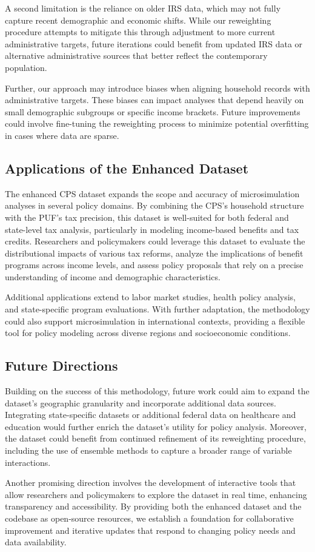 A second limitation is the reliance on older IRS data, which may not fully capture recent demographic and economic shifts. While our reweighting procedure attempts to mitigate this through adjustment to more current administrative targets, future iterations could benefit from updated IRS data or alternative administrative sources that better reflect the contemporary population.

Further, our approach may introduce biases when aligning household records with administrative targets. These biases can impact analyses that depend heavily on small demographic subgroups or specific income brackets. Future improvements could involve fine-tuning the reweighting process to minimize potential overfitting in cases where data are sparse.

\subsection{Applications of the Enhanced Dataset}

The enhanced CPS dataset expands the scope and accuracy of microsimulation analyses in several policy domains. By combining the CPS's household structure with the PUF's tax precision, this dataset is well-suited for both federal and state-level tax analysis, particularly in modeling income-based benefits and tax credits. Researchers and policymakers could leverage this dataset to evaluate the distributional impacts of various tax reforms, analyze the implications of benefit programs across income levels, and assess policy proposals that rely on a precise understanding of income and demographic characteristics.

Additional applications extend to labor market studies, health policy analysis, and state-specific program evaluations. With further adaptation, the methodology could also support microsimulation in international contexts, providing a flexible tool for policy modeling across diverse regions and socioeconomic conditions.

\subsection{Future Directions}

Building on the success of this methodology, future work could aim to expand the dataset's geographic granularity and incorporate additional data sources. Integrating state-specific datasets or additional federal data on healthcare and education would further enrich the dataset's utility for policy analysis. Moreover, the dataset could benefit from continued refinement of its reweighting procedure, including the use of ensemble methods to capture a broader range of variable interactions.

Another promising direction involves the development of interactive tools that allow researchers and policymakers to explore the dataset in real time, enhancing transparency and accessibility. By providing both the enhanced dataset and the codebase as open-source resources, we establish a foundation for collaborative improvement and iterative updates that respond to changing policy needs and data availability.
